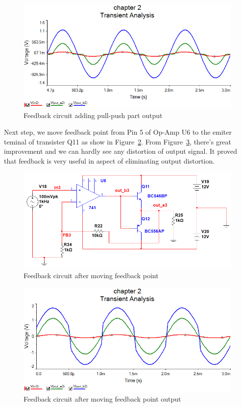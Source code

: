\begin{figure}[htbp]
	\centering
	\includegraphics[scale=0.7]{"../Photo/Chap2/Feedback_ini_before_data"}
	\caption{Feedback circuit adding pull-push part output}
	\label{fig:Feedback before data}
\end{figure}

Next step, we move feedback point from Pin 5 of Op-Amp U6 to the emiter teminal of transister Q11 as show in Figure~\ref{fig:Feedback after}. From Figure~\ref{fig:Feedback after data}, there's great improvement and we can hardly see any distortion of output signal. It proved that feedback is very useful in aspect of eliminating output distortion.


\begin{figure}[htbp]
	\centering
	\includegraphics[scale=0.7]{"../Photo/Chap2/Feed_back_ini_after"}
	\caption{Feedback circuit after moving feedback point}
	\label{fig:Feedback after}
\end{figure}

\begin{figure}[htbp]
	\centering
	\includegraphics[scale=0.7]{"../Photo/Chap2/Feedback_ini_after_data"}
	\caption{Feedback circuit after moving feedback point output}
	\label{fig:Feedback after data}
\end{figure}


